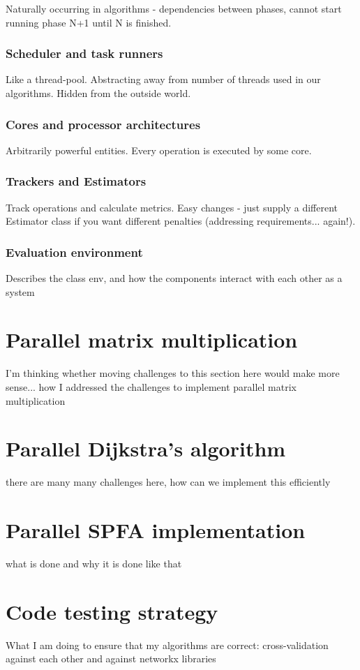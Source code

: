 \documentclass[12pt,a4paper,twoside,openright]{report}
\begin{document}
Naturally occurring in algorithms - dependencies between phases, cannot start running phase N+1 until N is finished.

\subsubsection{Scheduler and task runners}
Like a thread-pool. Abstracting away from number of threads used in our algorithms. Hidden from the outside world. 

\subsubsection{Cores and processor architectures}
Arbitrarily powerful entities. Every operation is executed by some core.

\subsubsection{Trackers and Estimators}
Track operations and calculate metrics. Easy changes - just supply a different Estimator class if you want different penalties (addressing requirements... again!).

\subsubsection{Evaluation environment}
Describes the class env, and how the components interact with each other as a system


\section{Parallel matrix multiplication}
I'm thinking whether moving challenges to this section here would make more sense... 
how I addressed the challenges to implement parallel matrix multiplication

\section{Parallel Dijkstra's algorithm}
there are many many challenges here, how can we implement this efficiently

\section{Parallel SPFA implementation}
what is done and why it is done like that

\section{Code testing strategy}
What I am doing to ensure that my algorithms are correct: cross-validation against each other and against networkx libraries
\end{document}
